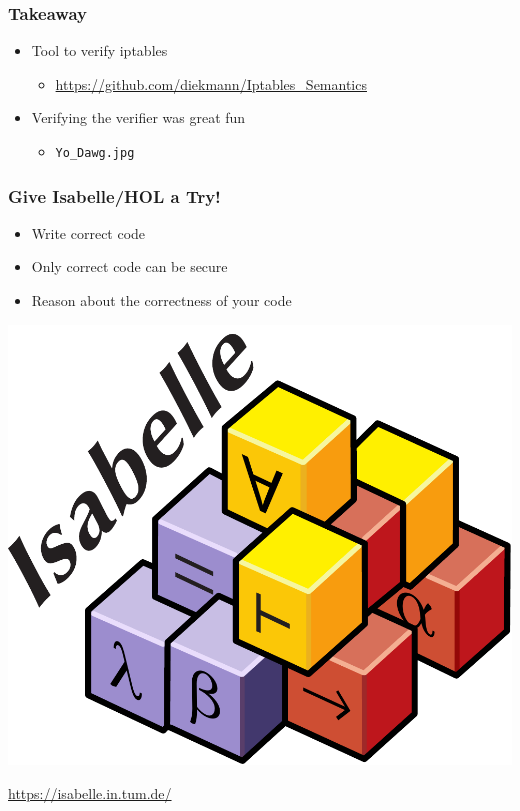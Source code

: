 \documentclass[aspectratio=169,t]{beamer}
\begin{document}
\begin{frame}
	\frametitle{Takeaway}
	\vspace*{5ex}
	\begin{itemize}
		\itemsep2ex
		\item Tool to verify iptables
		\begin{itemize}
			\item \url{https://github.com/diekmann/Iptables_Semantics}
		\end{itemize}
 		\item<2-> Verifying the verifier was great fun
 		\begin{itemize}
			\item \texttt{Yo\_Dawg.jpg}
		\end{itemize}
	\end{itemize}
\end{frame}

\begin{frame}
	\frametitle{Give Isabelle/HOL a Try!}
	\vspace*{5ex}
	\begin{itemize}
		\item Write correct code
		\item Only correct code can be secure
		\item Reason about the correctness of your code
	\end{itemize}
	\medskip
	\begin{center}
		\includegraphics[scale=.2]{isabelle.pdf}
	\end{center}
	\url{https://isabelle.in.tum.de/}
\end{frame}
\end{document}
